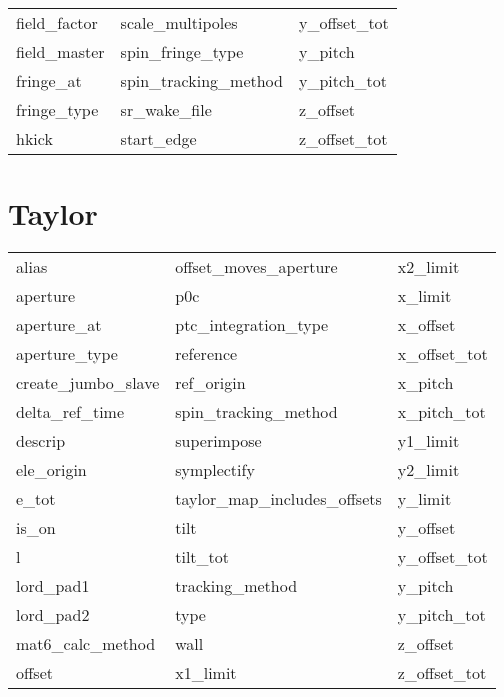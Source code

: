 \begin{tabular}{lll}
field_factor                & scale_multipoles            & y_offset_tot                \\
field_master                & spin_fringe_type            & y_pitch                     \\
fringe_at                   & spin_tracking_method        & y_pitch_tot                 \\
fringe_type                 & sr_wake_file                & z_offset                    \\
hkick                       & start_edge                  & z_offset_tot                \\
 \bottomrule
 \end{tabular}
 \vfill
 
 \section{Taylor}
 \label{s:list.taylor}
 
 \begin{tabular}{lll} \toprule
alias                       & offset_moves_aperture       & x2_limit                    \\
aperture                    & p0c                         & x_limit                     \\
aperture_at                 & ptc_integration_type        & x_offset                    \\
aperture_type               & reference                   & x_offset_tot                \\
create_jumbo_slave          & ref_origin                  & x_pitch                     \\
delta_ref_time              & spin_tracking_method        & x_pitch_tot                 \\
descrip                     & superimpose                 & y1_limit                    \\
ele_origin                  & symplectify                 & y2_limit                    \\
e_tot                       & taylor_map_includes_offsets & y_limit                     \\
is_on                       & tilt                        & y_offset                    \\
l                           & tilt_tot                    & y_offset_tot                \\
lord_pad1                   & tracking_method             & y_pitch                     \\
lord_pad2                   & type                        & y_pitch_tot                 \\
mat6_calc_method            & wall                        & z_offset                    \\
offset                      & x1_limit                    & z_offset_tot                \\
 \bottomrule
 \end{tabular}
 \vfill
 
